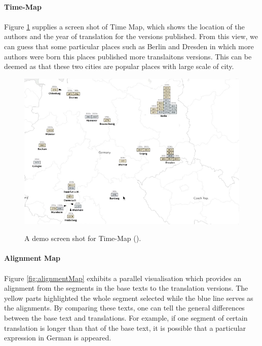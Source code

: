 \paragraph{Time-Map}
\paragraph[]{} 

Figure \ref{fig:timeMap} supplies a screen shot of Time Map, which shows the location of the authors and the year of translation for the versions published.  From this view, we can guess that some particular places such as Berlin and Dresden in which more authors were born this places published more translaitons versions. This can be deemed as that these two cities are popular places with large scale of city.

\begin{figure}[H] 
	\centering    
	\includegraphics[scale=0.7]{Figs/Time-Map}\\[1ex]
	\caption{A demo screen shot for Time-Map (\cite{Cheesman2012}).}
	\label{fig:timeMap}
\end{figure} 

\paragraph{Alignment Map}
\paragraph[]{}

Figure \ref{fig:alignmentMap} exhibits a parallel visualisation which provides an alignment from the segments in the base texts to the translation versions. The yellow parts highlighted the whole segment selected while the blue line serves as the alignments. By comparing these texts, one can tell the general differences between the base text and translations. For example, if one segment of certain translation is longer than that of the base text, it is possible that a particular expression in German is appeared. 

